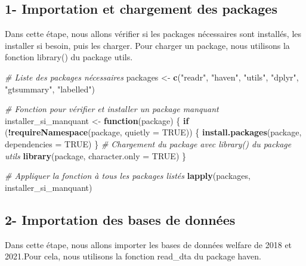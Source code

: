 \documentclass[
]{article}
\newenvironment{Shaded}{\begin{snugshade}}{\end{snugshade}}
\newcommand{\AttributeTok}[1]{\textcolor[rgb]{0.13,0.29,0.53}{#1}}
\newcommand{\CommentTok}[1]{\textcolor[rgb]{0.56,0.35,0.01}{\textit{#1}}}
\newcommand{\ConstantTok}[1]{\textcolor[rgb]{0.56,0.35,0.01}{#1}}
\newcommand{\ControlFlowTok}[1]{\textcolor[rgb]{0.13,0.29,0.53}{\textbf{#1}}}
\newcommand{\FunctionTok}[1]{\textcolor[rgb]{0.13,0.29,0.53}{\textbf{#1}}}
\newcommand{\NormalTok}[1]{#1}
\newcommand{\OtherTok}[1]{\textcolor[rgb]{0.56,0.35,0.01}{#1}}
\newcommand{\SpecialCharTok}[1]{\textcolor[rgb]{0.81,0.36,0.00}{\textbf{#1}}}
\newcommand{\StringTok}[1]{\textcolor[rgb]{0.31,0.60,0.02}{#1}}
\begin{document}
\hypertarget{importation-et-chargement-des-packages}{%
\subsection{1- Importation et chargement des
packages}\label{importation-et-chargement-des-packages}}

Dans cette étape, nous allons vérifier si les packages nécessaires sont
installés, les installer si besoin, puis les charger. Pour charger un
package, nous utilisons la fonction library() du package utils.

\begin{Shaded}
\begin{Highlighting}[]
\CommentTok{\# Liste des packages nécessaires }
\NormalTok{packages }\OtherTok{\textless{}{-}} \FunctionTok{c}\NormalTok{(}\StringTok{"readr"}\NormalTok{, }\StringTok{"haven"}\NormalTok{, }
              \StringTok{"utils"}\NormalTok{, }\StringTok{"dplyr"}\NormalTok{, }\StringTok{"gtsummary"}\NormalTok{, }\StringTok{"labelled"}\NormalTok{)}

\CommentTok{\# Fonction pour vérifier et installer un package manquant}
\NormalTok{installer\_si\_manquant }\OtherTok{\textless{}{-}} \ControlFlowTok{function}\NormalTok{(package) \{}
  \ControlFlowTok{if}\NormalTok{ (}\SpecialCharTok{!}\FunctionTok{requireNamespace}\NormalTok{(package, }\AttributeTok{quietly =} \ConstantTok{TRUE}\NormalTok{)) \{}
    \FunctionTok{install.packages}\NormalTok{(package, }\AttributeTok{dependencies =} \ConstantTok{TRUE}\NormalTok{)}
\NormalTok{  \}}
  \CommentTok{\# Chargement du package avec library() du package utils}
  \FunctionTok{library}\NormalTok{(package, }\AttributeTok{character.only =} \ConstantTok{TRUE}\NormalTok{)}
\NormalTok{\}}

\CommentTok{\# Appliquer la fonction à tous les packages listés}
\FunctionTok{lapply}\NormalTok{(packages, installer\_si\_manquant)}
\end{Highlighting}
\end{Shaded}

\hypertarget{importation-des-bases-de-donnuxe9es}{%
\subsection{2- Importation des bases de
données}\label{importation-des-bases-de-donnuxe9es}}

Dans cette étape, nous allons importer les bases de données welfare de
2018 et 2021.Pour cela, nous utilisons la fonction read\_dta du package
haven.
\end{document}
